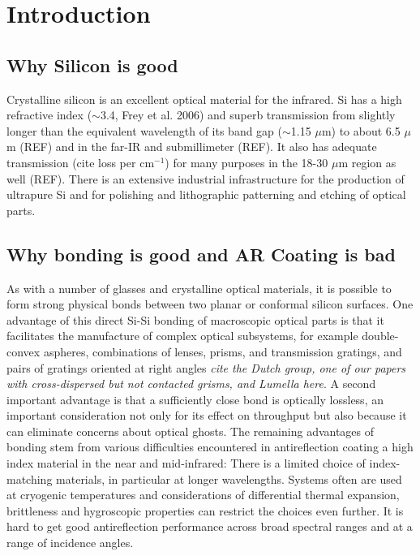 \documentclass[osajnl,preprint,showpacs,superscriptaddress,12pt]{revtex4-1} %
\begin{document}
\section{Introduction}


\subsection{Why Silicon is good}
Crystalline silicon is an excellent optical material for the infrared. Si has a high refractive index ($\sim$3.4, Frey et al. 2006) and superb transmission from slightly longer than the equivalent wavelength of its band gap ($\sim$1.15 $\mu$m) to about 6.5 $\mu$m (REF) and in the far-IR and submillimeter (REF).  It also has adequate transmission  (cite loss per cm$^{-1}$) for many purposes in the 18-30 $\mu$m region as well (REF).  There is an extensive industrial infrastructure for the production of ultrapure Si and for polishing and lithographic patterning and etching of optical parts.  

\subsection{Why bonding is good and AR Coating is bad}
As with a number of glasses and crystalline optical materials, it is possible to form strong physical bonds between two planar or conformal silicon surfaces.  One advantage of this direct Si-Si bonding of macroscopic optical parts is that it facilitates the manufacture of complex optical subsystems, for example double-convex aspheres, combinations of lenses, prisms, and transmission gratings, and pairs of gratings oriented at right angles \emph{cite the Dutch group, one of our papers with cross-dispersed but not contacted grisms, and Lumella here}.  A second important advantage is that a sufficiently close bond is optically lossless, an important consideration not only for its effect on throughput but also because it can eliminate concerns about optical ghosts.  The remaining advantages of bonding stem from various difficulties encountered in antireflection coating a high index material in the near and mid-infrared:  There is a limited choice of index-matching materials, in particular at longer wavelengths.  Systems often are used at cryogenic temperatures and considerations of differential thermal expansion, brittleness and hygroscopic properties can restrict the choices even further. It is hard to get good antireflection performance across broad spectral ranges and at a range of incidence angles. 
\end{document}
